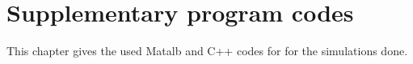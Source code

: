 \chapter{Supplementary program codes}
\label{app:ch:Matlab}
This chapter gives the used Matalb and C++ codes for for the simulations done.

%


%

%


